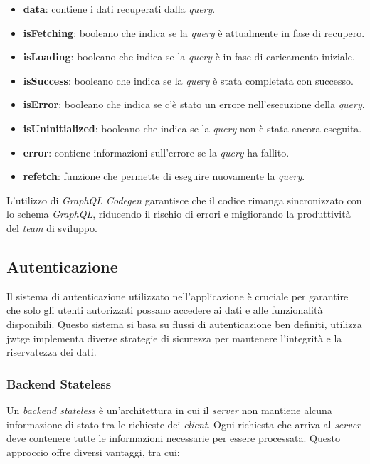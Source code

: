 \begin{itemize}
  \item \textbf{data}: contiene i dati recuperati dalla \textit{query}.
  \item \textbf{isFetching}: booleano che indica se la \textit{query} è attualmente in fase di recupero.
  \item \textbf{isLoading}: booleano che indica se la \textit{query} è in fase di caricamento iniziale.
  \item \textbf{isSuccess}: booleano che indica se la \textit{query} è stata completata con successo.
  \item \textbf{isError}: booleano che indica se c'è stato un errore nell'esecuzione della \textit{query}.
  \item \textbf{isUninitialized}: booleano che indica se la \textit{query} non è stata ancora eseguita.
  \item \textbf{error}: contiene informazioni sull'errore se la \textit{query} ha fallito.
  \item \textbf{refetch}: funzione che permette di eseguire nuovamente la \textit{query}.
\end{itemize}

L'utilizzo di \textit{GraphQL Codegen} garantisce che il codice rimanga sincronizzato con lo schema \textit{GraphQL}, 
riducendo il rischio di errori e migliorando la produttività del \textit{team} di sviluppo.





\subsection{Autenticazione}
\label{subsec:autenticazione}

Il sistema di autenticazione utilizzato nell'applicazione è cruciale per garantire che solo gli utenti autorizzati possano accedere ai dati e alle funzionalità disponibili.
Questo sistema si basa su flussi di autenticazione ben definiti, utilizza \gls{jwtg}\glox e implementa diverse strategie di sicurezza per mantenere l'integrità e la riservatezza dei dati.

\subsubsection{Backend Stateless}
Un \textit{backend stateless} è un'architettura in cui il \textit{server} non mantiene alcuna informazione di stato tra le richieste dei \textit{client}.
Ogni richiesta che arriva al \textit{server} deve contenere tutte le informazioni necessarie per essere processata.
Questo approccio offre diversi vantaggi, tra cui:

